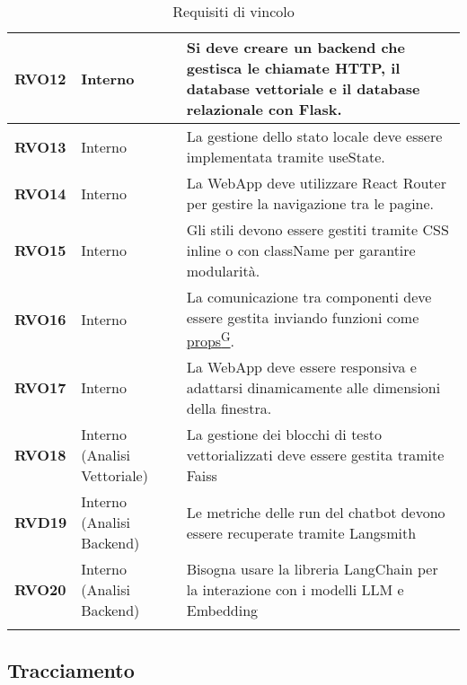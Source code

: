 \begin{longtable}{|>{\centering\arraybackslash}m{}|>{\centering\arraybackslash}m{}|>{\centering\arraybackslash}m{}|}
	\hline
	\textbf{RVO12} & Interno & Si deve creare un backend che gestisca le chiamate HTTP, il database vettoriale e il database relazionale con Flask.\\
	\hline
	\textbf{RVO13} & Interno & La gestione dello stato locale deve essere implementata tramite useState.\\
	\hline
	\textbf{RVO14} & Interno & La WebApp deve utilizzare React Router per gestire la navigazione tra le pagine.\\
	\hline
	\textbf{RVO15} & Interno & Gli stili devono essere gestiti tramite CSS inline o con className per garantire modularità.\\
	\hline
	\textbf{RVO16} & Interno & La comunicazione tra componenti deve essere gestita inviando funzioni come \href{https://code7crusaders.github.io/docs/PB/documentazione_interna/glossario.html#props}{props\textsuperscript{G}}.\\
	\hline
	\textbf{RVO17} & Interno & La WebApp deve essere responsiva e adattarsi dinamicamente alle dimensioni della finestra.\\
	\hline
	\textbf{RVO18} & Interno (Analisi Vettoriale) & La gestione dei blocchi di testo vettorializzati deve essere gestita tramite Faiss\\
	\hline
	\textbf{RVD19} & Interno (Analisi Backend) & Le metriche delle run del chatbot devono essere recuperate tramite Langsmith\\
	\hline
	\textbf{RVO20} & Interno (Analisi Backend) & Bisogna usare la libreria LangChain per la interazione con i modelli LLM e Embedding\\
	\hline
	\caption{Requisiti di vincolo}
\end{longtable}


\pagebreak
\subsection{Tracciamento}
